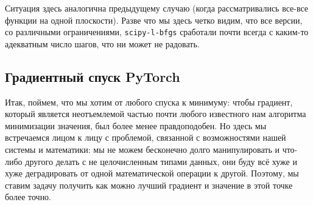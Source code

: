 \documentclass[12pt, a4paper, oneside, final]{article}
\begin{document}
	Ситуация здесь аналогична предыдущему случаю (когда рассматривались все-все функции на одной плоскости).
	Разве что мы здесь четко видим, что все версии, со различными ограничениями, \texttt{scipy-l-bfgs} сработали почти всегда с каким-то адекватным число шагов, что ни может не радовать.
	\subsection*{Градиентный спуск PyTorch}
	Итак, поймем, что мы хотим от любого спуска к минимуму: чтобы градиент, который является неотъемлемой частью почти любого известного нам алгоритма минимизации значения, был более менее правдоподобен.
	Но здесь мы встречаемся лицом к лицу с проблемой, связанной с возможностями нашей системы и математики: мы не можем бесконечно долго манипулировать и что-либо другого делать с не целочисленным типами данных, они буду всё хуже и хуже деградировать от одной математической операции к другой.
	Поэтому, мы ставим задачу получить как можно лучший градиент и значение в этой точке более точно.
\end{document}
